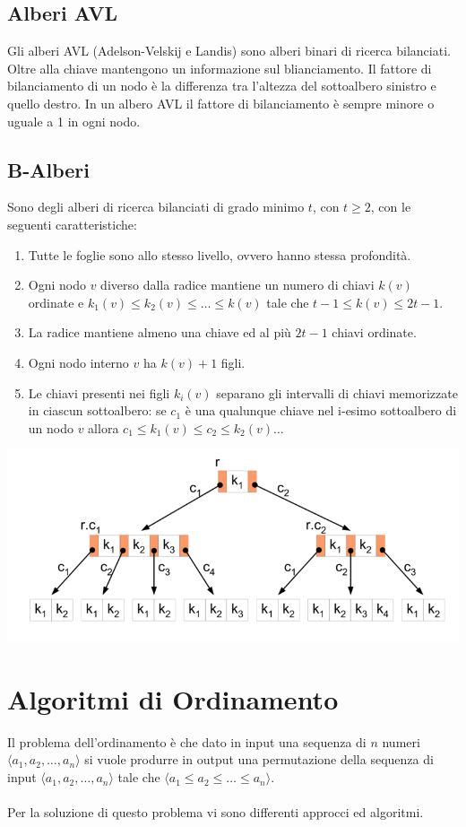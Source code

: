 \documentclass[italian]{article}
\begin{document}
\pagebreak
\subsection{Alberi AVL}
Gli alberi AVL (Adelson-Velskij e Landis) sono alberi binari di ricerca bilanciati. Oltre alla chiave mantengono un informazione sul blianciamento. Il fattore di bilanciamento di un nodo è la differenza tra l'altezza del sottoalbero sinistro e quello destro. In un albero AVL il fattore di bilanciamento è sempre minore o uguale a 1 in ogni nodo.

\subsection{B-Alberi}
Sono degli alberi di ricerca bilanciati di grado minimo $t$, con $t \geq 2$, con le seguenti caratteristiche:
\begin{enumerate}[itemsep=0pt,label=\arabic*)]
	\item Tutte le foglie sono allo stesso livello, ovvero hanno stessa profondità.
	\item Ogni nodo $v$ diverso dalla radice mantiene un numero di chiavi $k(v)$ ordinate e $k_1(v) \leq k_2(v) \leq \dots \leq k(v)$ tale che $t-1 \leq k(v) \leq 2t-1$.
	\item La radice mantiene almeno una chiave ed al più $2t-1$ chiavi ordinate.
	\item Ogni nodo interno $v$ ha $k(v)+1$ figli.
	\item Le chiavi presenti nei figli $k_i(v)$ separano gli intervalli di chiavi memorizzate in ciascun sottoalbero: se $c_1$ è una qualunque chiave nel i-esimo sottoalbero di un nodo $v$ allora $c_1 \leq k_1(v) \leq c_2 \leq k_2(v) \dots$
\end{enumerate}
\begin{center}
	\includegraphics[width=0.7\linewidth]{images/b_tree}
\end{center}
\pagebreak

\section{Algoritmi di Ordinamento}
Il problema dell’ordinamento è che dato in input una sequenza di $n$ numeri $\langle a_1,a_2,\dots, a_n \rangle$ si vuole produrre in output una permutazione della sequenza di input $\langle a_1,a_2,\dots, a_n \rangle$ tale che
$\langle a_1 \leq a_2 \leq \dots \leq a_n \rangle$. \\\\
Per la soluzione di questo problema vi sono differenti approcci ed algoritmi.
\end{document}
